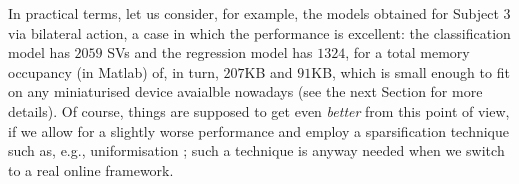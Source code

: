 In practical terms, let us consider, for example, the models obtained
for Subject $3$ via bilateral action, a case in which the performance
is excellent: the classification model has $2059$ SVs and the
regression model has $1324$, for a total memory occupancy (in Matlab)
of, in turn, $207$KB and $91$KB, which is small enough to fit on any
miniaturised device avaialble nowadays (see the next Section for more
details). Of course, things are supposed to get even \emph{better}
from this point of view, if we allow for a slightly worse performance
and employ a sparsification technique such as, e.g., uniformisation
\cite{2008.ICRA,2008.BioCyb}; such a technique is anyway needed when
we switch to a real online framework.
